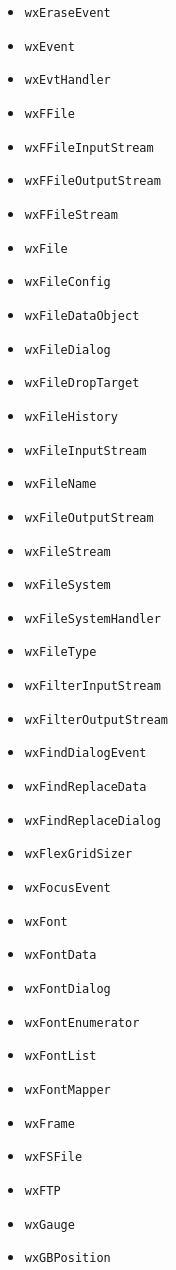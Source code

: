 \documentclass[a4paper,11pt,oneside,titlepage]{report}
\begin{document}
\begin{itemize}
\item \texttt{wxEraseEvent}
\item \texttt{wxEvent}
\item \texttt{wxEvtHandler}
\item \texttt{wxFFile}
\item \texttt{wxFFileInputStream}
\item \texttt{wxFFileOutputStream}
\item \texttt{wxFFileStream}
\item \texttt{wxFile}
\item \texttt{wxFileConfig}
\item \texttt{wxFileDataObject}
\item \texttt{wxFileDialog}
\item \texttt{wxFileDropTarget}
\item \texttt{wxFileHistory}
\item \texttt{wxFileInputStream}
\item \texttt{wxFileName}
\item \texttt{wxFileOutputStream}
\item \texttt{wxFileStream}
\item \texttt{wxFileSystem}
\item \texttt{wxFileSystemHandler}
\item \texttt{wxFileType}
\item \texttt{wxFilterInputStream}
\item \texttt{wxFilterOutputStream}
\item \texttt{wxFindDialogEvent}
\item \texttt{wxFindReplaceData}
\item \texttt{wxFindReplaceDialog}
\item \texttt{wxFlexGridSizer}
\item \texttt{wxFocusEvent}
\item \texttt{wxFont}
\item \texttt{wxFontData}
\item \texttt{wxFontDialog}
\item \texttt{wxFontEnumerator}
\item \texttt{wxFontList}
\item \texttt{wxFontMapper}
\item \texttt{wxFrame}
\item \texttt{wxFSFile}
\item \texttt{wxFTP}
\item \texttt{wxGauge}
\item \texttt{wxGBPosition}

\end{itemize}
\end{document}
